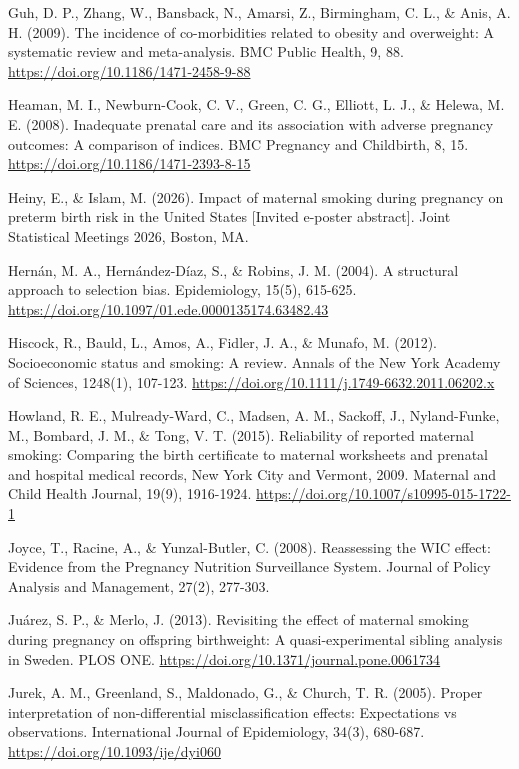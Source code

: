 \documentclass[11pt,letterpaper]{article}
\begin{document}
{Guh, D. P., Zhang, W., Bansback, N., Amarsi, Z., Birmingham, C. L., \& Anis, A. H. (2009). The incidence of co-morbidities related to obesity and overweight: A systematic review and meta-analysis. BMC Public Health, 9, 88. \url{https://doi.org/10.1186/1471-2458-9-88}

Heaman, M. I., Newburn-Cook, C. V., Green, C. G., Elliott, L. J., \& Helewa, M. E. (2008). Inadequate prenatal care and its association with adverse pregnancy outcomes: A comparison of indices. BMC Pregnancy and Childbirth, 8, 15. \url{https://doi.org/10.1186/1471-2393-8-15}

Heiny, E., \& Islam, M. (2026). Impact of maternal smoking during pregnancy on preterm birth risk in the United States [Invited e-poster abstract]. Joint Statistical Meetings 2026, Boston, MA.

Hernán, M. A., Hernández-Díaz, S., \& Robins, J. M. (2004). A structural approach to selection bias. Epidemiology, 15(5), 615-625. \url{https://doi.org/10.1097/01.ede.0000135174.63482.43}

Hiscock, R., Bauld, L., Amos, A., Fidler, J. A., \& Munafo, M. (2012). Socioeconomic status and smoking: A review. Annals of the New York Academy of Sciences, 1248(1), 107-123. \url{https://doi.org/10.1111/j.1749-6632.2011.06202.x}

Howland, R. E., Mulready-Ward, C., Madsen, A. M., Sackoff, J., Nyland-Funke, M., Bombard, J. M., \& Tong, V. T. (2015). Reliability of reported maternal smoking: Comparing the birth certificate to maternal worksheets and prenatal and hospital medical records, New York City and Vermont, 2009. Maternal and Child Health Journal, 19(9), 1916-1924. \url{https://doi.org/10.1007/s10995-015-1722-1}

Joyce, T., Racine, A., \& Yunzal-Butler, C. (2008). Reassessing the WIC effect: Evidence from the Pregnancy Nutrition Surveillance System. Journal of Policy Analysis and Management, 27(2), 277-303.

Juárez, S. P., \& Merlo, J. (2013). Revisiting the effect of maternal smoking during pregnancy on offspring birthweight: A quasi-experimental sibling analysis in Sweden. PLOS ONE. \url{https://doi.org/10.1371/journal.pone.0061734}

Jurek, A. M., Greenland, S., Maldonado, G., \& Church, T. R. (2005). Proper interpretation of non-differential misclassification effects: Expectations vs observations. International Journal of Epidemiology, 34(3), 680-687. \url{https://doi.org/10.1093/ije/dyi060}

}
\end{document}
